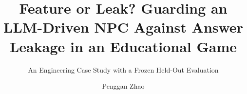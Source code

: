 \documentclass[sigconf,nonacm]{acmart}
\begin{document}
\title{Feature or Leak? Guarding an LLM-Driven NPC Against Answer Leakage in an Educational Game}
\subtitle{An Engineering Case Study with a Frozen Held-Out Evaluation}

\author{Penggan Zhao}

\begin{abstract}

\end{abstract}


\maketitle









\begin{acks}

\end{acks}



\end{document}
